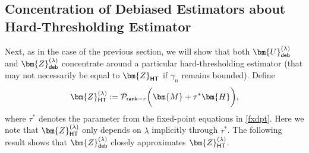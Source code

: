 \documentclass[10pt]{article}
\newcommand{\s}{^*}
\theoremstyle{definition}
\begin{document}
\subsection{Concentration of Debiased Estimators about Hard-Thresholding Estimator} \label{sec:debcontrol}
Next, as in the case of the previous section, we will show that both $\bm{U}^{(\lambda)}_{{\sf deb}}$ and $\bm{Z}^{(\lambda)}_{{\sf deb}}$ concentrate around a particular hard-thresholding estimator (that may not necessarily be equal to $\bm{Z}_{{\sf HT}}$ if $\gamma_n$ remains bounded).  Define 
\begin{align}
    \bm{Z}^{(\lambda)}_{{\sf HT}} := \mathcal{P}_{{\sf rank}-r} \bigg( \bm{M} + \tau\s \bm{H} \bigg),
\end{align}
where $\tau\s$ denotes the parameter from the fixed-point equations in \eqref{fxdpt}.  Here we note that $\bm{Z}_{{\sf HT}}^{(\lambda)}$ only depends on $\lambda$ implicitly through $\tau\s$.  
The following result shows that $\bm{Z}_{{\sf deb}}^{(\lambda)}$ closely approximates $\bm{Z}_{{\sf HT}}^{(\lambda)}$.  
\end{document}
